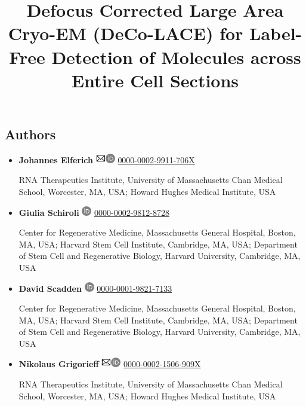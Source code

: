 \documentclass[
]{article}
\title{Defocus Corrected Large Area Cryo-EM (DeCo-LACE) for Label-Free Detection of Molecules across Entire Cell Sections}
\author{}
\date{}
\begin{document}
\maketitle

\hypertarget{authors}{%
\subsection{Authors}\label{authors}}

\begin{itemize}
\item
  \textbf{Johannes Elferich}
  \includegraphics[width=0.16667in,height=0.16667in]{images/envelope.pdf}\includegraphics[width=0.16667in,height=0.16667in]{images/orcid.pdf}
  \href{https://orcid.org/0000-0002-9911-706X}{0000-0002-9911-706X}

  RNA Therapeutics Institute, University of
  Massachusetts Chan Medical School, Worcester, MA, USA; Howard Hughes
  Medical Institute, USA
\item
  \textbf{Giulia Schiroli} \includegraphics[width=0.16667in,height=0.16667in]{images/orcid.pdf}
  \href{https://orcid.org/0000-0002-9812-8728}{0000-0002-9812-8728}

  Center for Regenerative Medicine, Massachusetts
  General Hospital, Boston, MA, USA; Harvard Stem Cell Institute,
  Cambridge, MA, USA; Department of Stem Cell and Regenerative
  Biology, Harvard University, Cambridge, MA, USA
\item
  \textbf{David Scadden} \includegraphics[width=0.16667in,height=0.16667in]{images/orcid.pdf}
  \href{https://orcid.org/0000-0001-9821-7133}{0000-0001-9821-7133}

  Center for Regenerative Medicine, Massachusetts
  General Hospital, Boston, MA, USA; Harvard Stem Cell Institute,
  Cambridge, MA, USA; Department of Stem Cell and Regenerative
  Biology, Harvard University, Cambridge, MA, USA
\item
  \textbf{Nikolaus Grigorieff}
  \includegraphics[width=0.16667in,height=0.16667in]{images/envelope.pdf}\includegraphics[width=0.16667in,height=0.16667in]{images/orcid.pdf}
  \href{https://orcid.org/0000-0002-1506-909X}{0000-0002-1506-909X}

  RNA Therapeutics Institute, University of
  Massachusetts Chan Medical School, Worcester, MA, USA; Howard Hughes
  Medical Institute, USA
\end{itemize}
\end{document}
